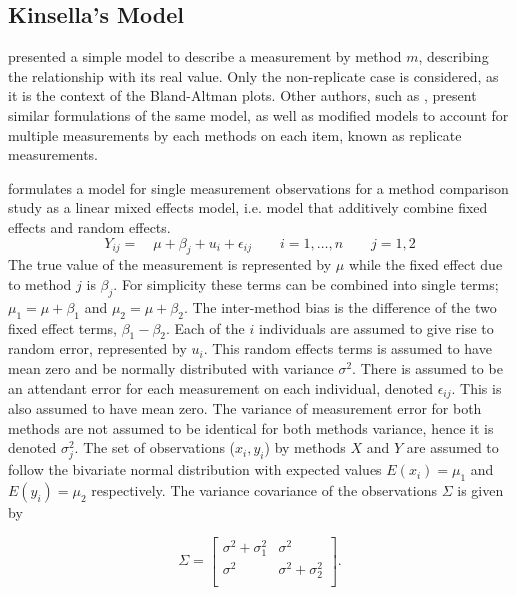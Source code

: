\documentclass[12pt, a4paper]{report}
\theoremstyle{plain}
\theoremstyle{definition}
\theoremstyle{remark}
\begin{document}
%
\subsection*{Kinsella's Model}
\citet{Kinsella} presented a simple model to describe a measurement by method $m$, describing the relationship with its real value. Only the non-replicate case is considered, as it is the context of the Bland-Altman plots. Other authors, such as \citet{BXC2004,BXC2008}, present similar formulations of the same model, as well as modified models to account for multiple measurements by each methods on each item, known as replicate measurements.

\citet{Kinsella} formulates a model for
single measurement observations for a method comparison study as a
linear mixed effects model, i.e. model that additively combine
fixed effects and random effects.
\[
Y_{ij} =\quad \mu + \beta_{j} + u_{i} + \epsilon_{ij} \qquad i = 1,\dots,n
\qquad j=1,2\]
The true value of the measurement is represented by $\mu$ while the fixed effect due to method $j$ is $\beta_{j}$.
For simplicity these terms can be combined into single terms; $\mu_{1} = \mu+ \beta_{1}$ and $\mu_{2} = \mu + \beta_{2}$. The inter-method bias is the difference of the two fixed effect terms, $\beta_{1}-\beta_{2}$. Each of the $i$ individuals are assumed to give rise to random error, represented by $u_{i}$. This random effects terms is assumed to have mean zero and be normally distributed with variance $\sigma^2$. There is assumed to be an attendant error for each measurement on each individual, denoted $\epsilon_{ij}$. This is also assumed to have mean zero. The variance of measurement error for both methods are not assumed to be identical for both methods variance,  hence it is denoted $\sigma^2_{j}$. The set of observations ($x_{i},y_{i}$) by methods $X$ and $Y$ are assumed to follow the bivariate normal distribution with expected values $E(x_{i})= \mu_{1}$ and $E(y_{i})= \mu_{2}$ respectively. The variance covariance of the observations $\Sigma$ is given by

\[
\Sigma = \left[
\begin{array}{cc}
\sigma^{2} + \sigma^{2}_{1} & \sigma^{2} \\
\sigma^{2} & \sigma^{2} + \sigma^{2}_{2} \\
\end{array}
\right].
\]
\end{document}
